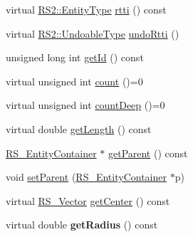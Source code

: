 \begin{DoxyCompactItemize}
\item 
virtual \hyperlink{classRS2_a8f26d1b981e1e85cff16738b43337e6a}{R\-S2\-::\-Entity\-Type} \hyperlink{classRS__Entity_a1d50dcc5016e016c0b944deb1b685cf1}{rtti} () const 
\item 
virtual \hyperlink{classRS2_ab5fe5e99761abbb178f2e132d4ac84ee}{R\-S2\-::\-Undoable\-Type} \hyperlink{classRS__Entity_a224d378cdafc8b11dc3a1548ae93dc1d}{undo\-Rtti} ()
\item 
unsigned long int \hyperlink{classRS__Entity_a181288256610634e356ed4b113f6ebc6}{get\-Id} () const 
\item 
virtual unsigned int \hyperlink{classRS__Entity_af25ca6944707617f04fc92086d413595}{count} ()=0
\item 
virtual unsigned int \hyperlink{classRS__Entity_a6f6f5cd0299eba32062af0fd5851f9e4}{count\-Deep} ()=0
\item 
virtual double \hyperlink{classRS__Entity_afd125731aa0dc1e9cb03766435773237}{get\-Length} () const 
\item 
\hyperlink{classRS__EntityContainer}{R\-S\-\_\-\-Entity\-Container} $\ast$ \hyperlink{classRS__Entity_aa7bfa0240b70dae68e865af93a80ce9f}{get\-Parent} () const 
\item 
void \hyperlink{classRS__Entity_a4a52c5b939daa95d30872cb1eea2d426}{set\-Parent} (\hyperlink{classRS__EntityContainer}{R\-S\-\_\-\-Entity\-Container} $\ast$p)
\item 
virtual \hyperlink{classRS__Vector}{R\-S\-\_\-\-Vector} \hyperlink{classRS__Entity_a93d5bc7202acc04ed5d785e1ed883f2d}{get\-Center} () const 
\item 
\hypertarget{classRS__Entity_a6df375878d3e64c56c4fd0d459fe276b}{virtual double {\bfseries get\-Radius} () const }\label{classRS__Entity_a6df375878d3e64c56c4fd0d459fe276b}


\end{DoxyCompactItemize}
